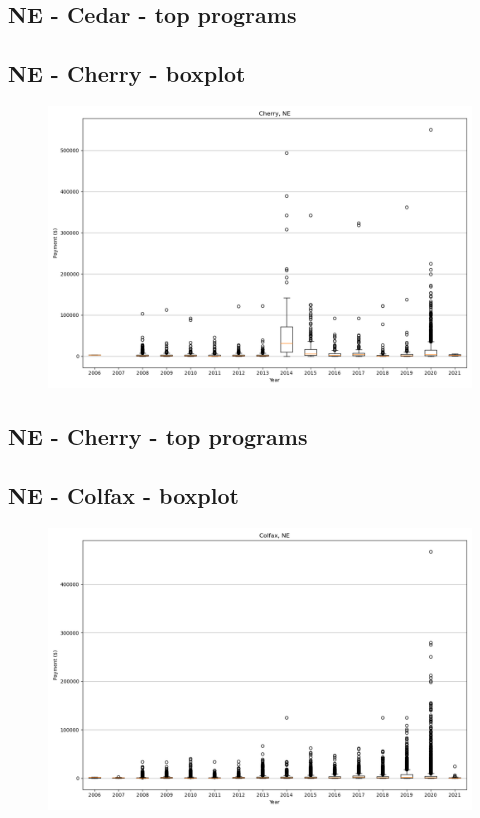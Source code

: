 \subsection*{NE - Cedar - top programs}

\newpage
\subsection*{NE - Cherry - boxplot}
\begin{figure}[h]
\centering
\includegraphics[width=7in]{../output/boxplots/counties/Cherry-NE_boxplot.png}
\end{figure}


\subsection*{NE - Cherry - top programs}

\newpage
\subsection*{NE - Colfax - boxplot}
\begin{figure}[h]
\centering
\includegraphics[width=7in]{../output/boxplots/counties/Colfax-NE_boxplot.png}
\end{figure}



